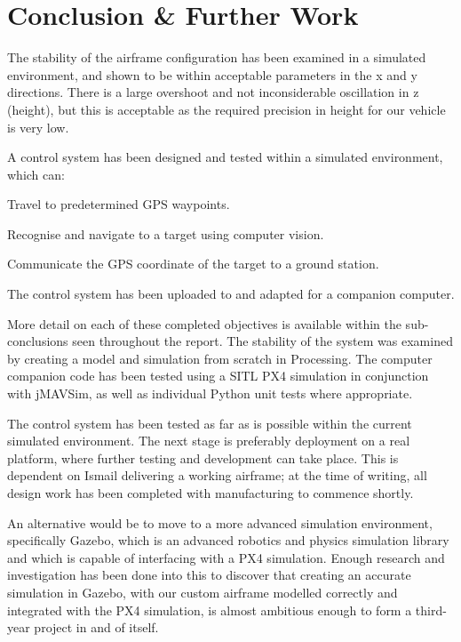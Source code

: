 \documentclass[11pt]{article}
\begin{document}
\section{Conclusion \& Further Work}
\begin{compactenum}
    \item The stability of the airframe configuration has been examined in a simulated environment, and shown to be within acceptable parameters in the x and y directions. There is a large overshoot and not inconsiderable oscillation in z (height), but this is acceptable as the required precision in height for our vehicle is very low.
    \item A control system has been designed and tested within a simulated environment, which can:
    \begin{compactenum}
        \item Travel to predetermined GPS waypoints.
        \item Recognise and navigate to a target using computer vision.
        \item Communicate the GPS coordinate of the target to a ground station.
    \end{compactenum}
    \item The control system has been uploaded to and adapted for a companion computer.
\end{compactenum}
\vspace{1em}

More detail on each of these completed objectives is available within the sub-conclusions seen throughout the report. The stability of the system was examined by creating a model and simulation from scratch in Processing. The computer companion code has been tested using a SITL PX4 simulation in conjunction with jMAVSim, as well as individual Python unit tests where appropriate.

The control system has been tested as far as is possible within the current simulated environment. The next stage is preferably deployment on a real platform, where further testing and development can take place. This is dependent on Ismail delivering a working airframe; at the time of writing, all design work has been completed with manufacturing to commence shortly\cite{Ismail_paper}.

An alternative would be to move to a more advanced simulation environment, specifically Gazebo, which is an advanced robotics and physics simulation library and which is capable of interfacing with a PX4 simulation\cite{PX4_dev_guide}. Enough research and investigation has been done into this to discover that creating an accurate simulation in Gazebo, with our custom airframe modelled correctly and integrated with the PX4 simulation, is almost ambitious enough to form a third-year project in and of itself.
\end{document}
